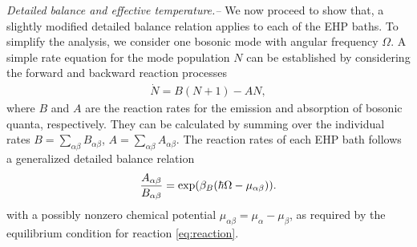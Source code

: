 \documentclass[aps
,twocolumn
,floatfix,footinbib,prl
]{revtex4-1}
\begin{document}
\emph{Detailed balance and effective temperature.--}
We now proceed to show that, a slightly modified detailed balance relation applies to each of the EHP baths. 
To simplify the analysis, we consider one bosonic mode with angular frequency $\Omega$. A simple rate equation for the mode population $N$ can be established by considering the forward and backward reaction processes
\begin{align}
\dot{N} = B (N+1) - A N,
\end{align}
where $B$ and $A$ are the reaction rates for the emission and absorption of bosonic quanta, respectively. They can be calculated by summing over the individual rates $B=\sum_{\alpha\beta}B_{\alpha\beta}$, $A=\sum_{\alpha\beta}A_{\alpha\beta}$.
The reaction rates of each EHP bath follows a generalized detailed balance relation
\begin{align}
\frac{A_{\alpha\beta}}{B_{\alpha\beta}} = {\rm exp}(\beta_B(\hbar\Omega-\mu_{\alpha\beta})).
\end{align}
with a possibly nonzero chemical potential $\mu_{\alpha\beta}=\mu_\alpha-\mu_\beta$, as required by the equilibrium condition for reaction \ref{eq:reaction}.

\end{document}
